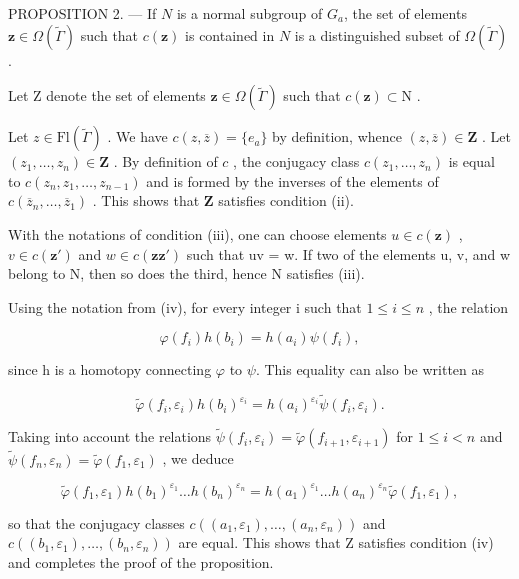 PROPOSITION 2. --- If \(N\) is a normal subgroup of \(G_{a}\), the set of elements \(\mathbf{z} \in \Omega(\widetilde{\Gamma})\) such that \(c(\mathbf{z})\) is contained in \(N\) is a distinguished subset of \(\Omega(\widetilde{\Gamma})\).

Let Z denote the set of elements \(\mathbf{z} \in \Omega(\widetilde{\Gamma})\) such that \(c(\mathbf{z}) \subset \mathrm{N}\) .

Let \(z \in \mathrm{Fl}(\widetilde{\Gamma})\) . We have \(c(z, \overline{z}) = \{e_a\}\) by definition, whence \((z, \overline{z}) \in \mathbf{Z}\) . Let \((z_1, \ldots, z_n) \in \mathbf{Z}\) . By definition of \(c\) , the conjugacy class \(c(z_1, \ldots, z_n)\) is equal to \(c(z_n, z_1, \ldots, z_{n-1})\) and is formed by the inverses of the elements of \(c(\overline{z}_n, \ldots, \overline{z}_1)\) . This shows that \(\mathbf{Z}\) satisfies condition (ii).

With the notations of condition (iii), one can choose elements \(u \in c(\mathbf{z})\) , \(v \in c(\mathbf{z}')\) and \(w \in c(\mathbf{z}\mathbf{z}')\) such that uv = w. If two of the elements u, v, and w belong to N, then so does the third, hence N satisfies (iii).

Using the notation from (iv), for every integer i such that \(1 \leqslant i \leqslant n\) , the relation

\[
  \varphi (f _ {i}) h (b _ {i}) = h (a _ {i}) \psi (f _ {i}),
\]

since h is a homotopy connecting \(\varphi\) to \(\psi\). This equality can also be written as

\[
\widetilde {\varphi} (f _ {i}, \varepsilon_ {i}) h (b _ {i}) ^ {\varepsilon_ {i}} = h (a _ {i}) ^ {\varepsilon_ {i}} \widetilde {\psi} (f _ {i}, \varepsilon_ {i}).
\]

Taking into account the relations \(\widetilde{\psi}(f_i,\varepsilon_i) = \widetilde{\varphi}(f_{i + 1},\varepsilon_{i + 1})\) for \(1\leqslant i <   n\) and \(\widetilde{\psi} (f_n,\varepsilon_n) = \widetilde{\varphi} (f_1,\varepsilon_1)\) , we deduce

\[
\widetilde {\varphi} (f _ {1}, \varepsilon_ {1}) h (b _ {1}) ^ {\varepsilon_ {1}} \dots h (b _ {n}) ^ {\varepsilon_ {n}} = h (a _ {1}) ^ {\varepsilon_ {1}} \dots h (a _ {n}) ^ {\varepsilon_ {n}} \widetilde {\varphi} (f _ {1}, \varepsilon_ {1}),
\]

so that the conjugacy classes \(c((a_{1},\varepsilon_{1}),\ldots,(a_{n},\varepsilon_{n}))\) and \(c((b_{1},\varepsilon_{1}),\ldots,(b_{n},\varepsilon_{n}))\) are equal. This shows that Z satisfies condition (iv) and completes the proof of the proposition.

